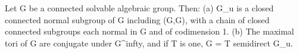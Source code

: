 Let G be a connected solvable algebraic group. Then: (a) G_u is a closed connected normal subgroup of G including (G,G), with a chain of closed connected subgroups each normal in G and of codimension 1. (b) The maximal tori of G are conjugate under G^{infty}, and if T is one, G = T semidirect G_u.
